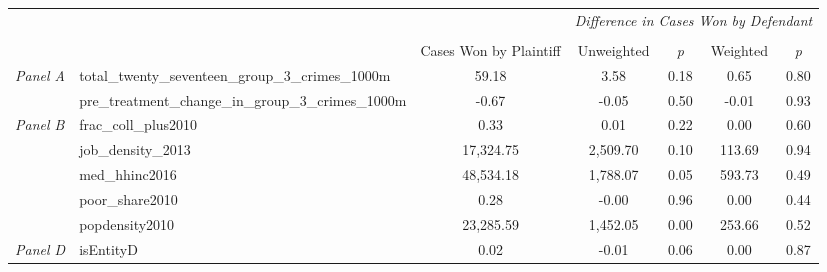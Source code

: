 \begin{tabular}{llccccc}
\toprule
 &  & \textit{} & \multicolumn{4}{c}{\textit{Difference in Cases Won by Defendant}} \\
\cline{4-7}
\\
 &  & Cases Won by Plaintiff & Unweighted & \emph{p} & Weighted & \emph{p} \\
\midrule
\multirow[c]{2}{3cm}{\textit{Panel A}} & total_twenty_seventeen_group_3_crimes_1000m & 59.18 & 3.58 & 0.18 & 0.65 & 0.80 \\
 & pre_treatment_change_in_group_3_crimes_1000m & -0.67 & -0.05 & 0.50 & -0.01 & 0.93 \\
\cline{1-7}
\multirow[c]{5}{3cm}{\textit{Panel B}} & frac_coll_plus2010 & 0.33 & 0.01 & 0.22 & 0.00 & 0.60 \\
 & job_density_2013 & 17,324.75 & 2,509.70 & 0.10 & 113.69 & 0.94 \\
 & med_hhinc2016 & 48,534.18 & 1,788.07 & 0.05 & 593.73 & 0.49 \\
 & poor_share2010 & 0.28 & -0.00 & 0.96 & 0.00 & 0.44 \\
 & popdensity2010 & 23,285.59 & 1,452.05 & 0.00 & 253.66 & 0.52 \\
\cline{1-7}
\textit{Panel D} & isEntityD & 0.02 & -0.01 & 0.06 & 0.00 & 0.87 \\
\cline{1-7}
\bottomrule
\end{tabular}
